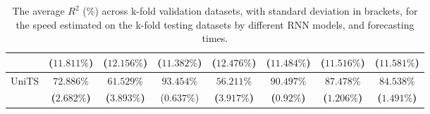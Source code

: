 \begin{table}[!ht]
{\begin{tabular}{|c|c|c|c|c|c|c|c|}
			 & ($11.811\%$) & ($12.156\%$) & ($11.382\%$) & ($12.476\%$) & ($11.484\%$) & ($11.516\%$) & ($11.581\%$) \\ \hline
			\multirow{2}{*}{UniTS} & $\mathbf{72.886\%}$ & $\mathbf{61.529\%}$ & $93.454\%$ & $\mathbf{56.211\%}$ & $\mathbf{90.497\%}$ & $\mathbf{87.478\%}$ & $\mathbf{84.538\%}$ \\
			 & \textbf{(}$\mathbf{2.682\%}$\textbf{)} & \textbf{(}$\mathbf{3.893\%}$\textbf{)} & ($0.637\%$) & \textbf{(}$\mathbf{3.917\%}$\textbf{)} & \textbf{(}$\mathbf{0.92\%}$\textbf{)} & \textbf{(}$\mathbf{1.206\%}$\textbf{)} & \textbf{(}$\mathbf{1.491\%}$\textbf{)} \\ \hline
		\end{tabular}
	}
	\caption{The average $R^{2}$ (\%) across k-fold validation datasets, with standard deviation in brackets, for the speed estimated on the k-fold testing datasets by different RNN models, and forecasting times.}
	\label{tab:all_speed_R2}
\end{table}